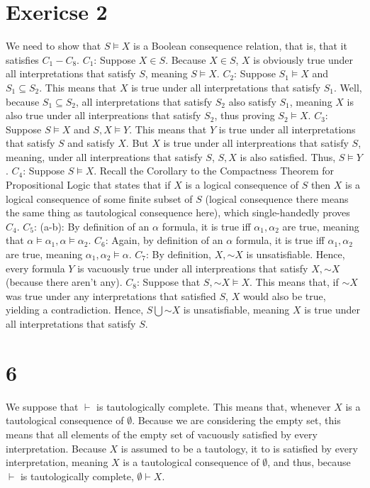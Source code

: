 \documentclass{article}
\newcommand*{\oldneg}{\mathord{\sim}}
\let\oldemptyset\emptyset
\theoremstyle{definition}
\begin{document}
\section*{Exericse 2}
We need to show that $S\vDash X$ is a Boolean consequence relation, that is, that it satisfies $C_1-C_8$.\newline
$C_1$: Suppose $X\in S$. Because $X\in S$, $X$ is obviously true under all interpretations that satisfy $S$, meaning $S\vDash X$.\newline
$C_2$: Suppose $S_1\vDash X$ and $S_1\subseteq S_2$. This means that $X$ is true under all interpretations that satisfy $S_1$. Well, because 
$S_1\subseteq S_2$, all interpretations that satisfy $S_2$ also satisfy $S_1$, meaning $X$ is also true under all interpreations that satisfy 
$S_2$, thus proving $S_2\vDash X$.\newline
$C_3$: Suppose $S\vDash X$ and $S,X\vDash Y$. This means that $Y$ is true under all interpretations that satisfy $S$ and satisfy $X$. But 
$X$ is true under all interpreations that satisfy $S$, meaning, under all interpreations that satisfy $S$, $S,X$ is also satisfied. Thus, 
$S\vDash Y$.\newline
$C_4$: Suppose $S\vDash X$. Recall the Corollary to the Compactness Theorem for Propositional Logic that states that 
if $X$ is a logical consequence of $S$ then $X$ is a logical consequence of some finite subset of $S$ (logical consequence there means the same 
thing as tautological consequence here), which single-handedly proves $C_4$.\newline
$C_5$: (a-b): By definition of an $\alpha$ formula, it is true iff $\alpha_1,\alpha_2$ are true, meaning that $\alpha\vDash\alpha_1,\alpha\vDash\alpha_2$.
\newline
$C_6$: Again, by definition of an $\alpha$ formula, it is true iff $\alpha_1,\alpha_2$ are true, meaning $\alpha_1,\alpha_2\vDash\alpha$.\newline
$C_7$: By definition, $X,\oldneg X$ is unsatisfiable. Hence, every formula $Y$ is vacuously true under all interpreations that satisfy $X,\oldneg X$ 
(because there aren't any). \newline
$C_8$: Suppose that $S,\oldneg X\vDash X$. This means that, if $\oldneg X$ was true under any interpretations that satisfied $S$, $X$ would also be 
true, yielding a contradiction. Hence, $S\bigcup\oldneg X$ is unsatisfiable, meaning $X$ is true under all interpretations that satisfy $S$.

\section*{6}
We suppose that $\vdash$ is tautologically complete. This means that, whenever $X$ is a tautological consequence of $\oldemptyset$. Because we are considering 
the empty set, this means that all elements of the empty set of vacuously satisfied by every interpretation. Because $X$ is assumed to be a tautology, 
it to is satisfied by every interpretation, meaning $X$ is a tautological consequence of $\oldemptyset$, and thus, because $\vdash$ is tautologically complete, 
$\oldemptyset\vdash X$.
\end{document}
